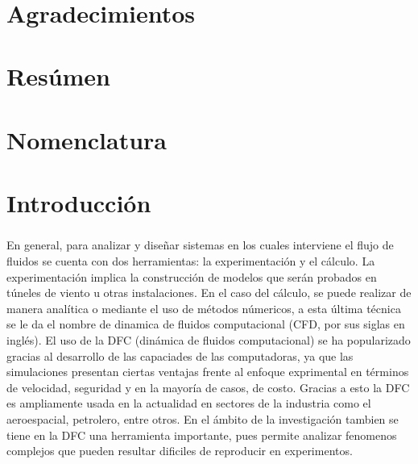 \documentclass[letterpaper, openright, 12pt]{book}
\begin{document}
	\newpage
	\begin{flushright}
		\textit{}
	\end{flushright}
	\ %

	\chapter*{Agradecimientos}

	\chapter*{Resúmen}

	\tableofcontents
	
	\cleardoublepage
	\listoffigures


	\cleardoublepage
	\listoftables
	\cleardoublepage

	\chapter*{Nomenclatura}

	\chapter*{Introducción}
	\paragraph*{}
    En general, para analizar y diseñar sistemas en los cuales interviene el
    flujo de fluidos se cuenta con dos herramientas: la experimentación y el
    cálculo. La experimentación implica la construcción de modelos que serán
    probados en túneles de viento u otras instalaciones. En el caso del cálculo,
    se puede realizar de manera analítica o mediante el uso de métodos númericos,
    a esta última técnica se le da el nombre de dinamica de fluidos
    computacional (CFD, por sus siglas en inglés). El uso de la DFC (dinámica
    de fluidos computacional) se ha popularizado gracias al desarrollo de las
    capaciades de las computadoras, ya que las simulaciones presentan ciertas
    ventajas frente al enfoque exprimental en términos de velocidad, seguridad
    y en la mayoría de casos, de costo. Gracias a esto la DFC es ampliamente
    usada en la actualidad en sectores de la industria como el aeroespacial,
    petrolero, entre otros. En el ámbito de la investigación tambien se tiene
    en la DFC una herramienta importante, pues permite analizar fenomenos
    complejos que pueden resultar dificiles de reproducir en experimentos.
\end{document}
